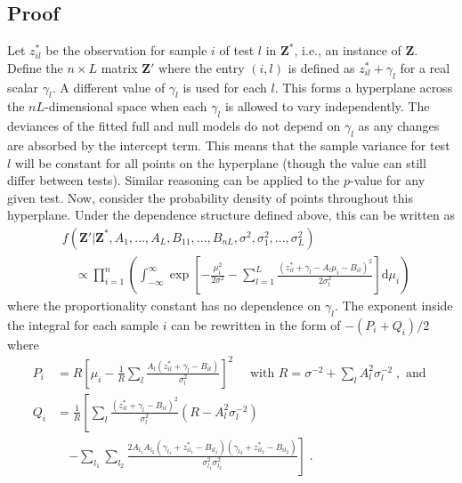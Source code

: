 \documentclass{article}
\newcommand{\nsamples}{n}
\newcommand{\sample}{i}
\newcommand{\normean}{\mu}
\newcommand{\normvar}{\sigma^2}
\newcommand{\modifier}{\gamma}
\newcommand{\logcount}{z}
\newcommand{\obsmat}[0]{\mathbf{Z}}
\newcommand{\matinst}[0]{\mathbf{Z^*}}
\newcommand{\modmat}[0]{\mathbf{Z}'}
\newcommand{\test}{l}
\newcommand{\ntests}{L}
\newcommand{\scaling}{A}
\newcommand{\interceptor}{B}
\newcommand{\scalar}{\scaling_\test}
\newcommand{\intercept}{\interceptor_{\sample\test}}
\newcommand{\testvar}{\normvar_\test}
\newcommand{\dt}{\modifier_\test}
\newcommand{\matlogcount}{\logcount^*_{\sample\test}}
\newcommand{\internalQ}{Q_\sample}
\newcommand{\internalR}{R}
\newcommand{\internalP}{P_\sample}
\newcommand{\invertvar}{\sigma^{-2}}
\newcommand{\inverttestvar}{\sigma^{-2}_\test}
\newcommand{\testone}{\test_1}
\newcommand{\testtwo}{\test_2}
\newcommand{\scalarone}{\scaling_{\testone}}
\newcommand{\interceptone}{\interceptor_{\sample\testone}}
\newcommand{\scalartwo}{\scaling_{\testtwo}}
\newcommand{\intercepttwo}{\interceptor_{\sample\testtwo}}
\newcommand{\dtone}{\modifier_{\testone}}
\newcommand{\dttwo}{\modifier_{\testtwo}}
\newcommand{\testvarone}{\normvar_{\testone}}
\newcommand{\testvartwo}{\normvar_{\testtwo}}
\newcommand{\matlogcountone}{\logcount^*_{\sample\testone}}
\newcommand{\matlogcounttwo}{\logcount^*_{\sample\testtwo}}
\begin{document}
\subsection{Proof}
Let $\matlogcount$ be the observation for sample $\sample$ of test $\test$ in $\matinst$, i.e., an instance of $\obsmat$.
Define the $\nsamples \times \ntests$ matrix $\modmat$ where the entry $(\sample, \test)$ is defined as $\matlogcount + \dt$ for a real scalar $\dt$.
A different value of $\dt$ is used for each $\test$.
This forms a hyperplane across the $\nsamples\ntests$-dimensional space when each $\dt$ is allowed to vary independently.
The deviances of the fitted full and null models do not depend on $\dt$ as any changes are absorbed by the intercept term.
This means that the sample variance for test $\test$ will be constant for all points on the hyperplane (though the value can still differ between tests).
Similar reasoning can be applied to the $p$-value for any given test.
Now, consider the probability density of points throughout this hyperplane. 
Under the dependence structure defined above, this can be written as
\begin{align*}
& f(\modmat | \matinst, \scaling_1, ..., \scaling_\ntests, \interceptor_{11}, ..., \interceptor_{\nsamples\ntests}, \normvar, \normvar_1, ..., \normvar_\ntests) \\
& \quad\propto \prod_{\sample=1}^\nsamples \left( \int_{-\infty}^{\infty} \exp\left[ - \frac{\normean_\sample^2}{2\normvar} 
	- \sum_{\test=1}^\ntests \frac{(\matlogcount + \dt - \scalar\normean_\sample - \intercept )^2}{2\testvar} \right]\mbox{d}\mu_\sample \right) 
\end{align*}
where the proportionality constant has no dependence on $\dt$.  
The exponent inside the integral for each sample $i$ can be rewritten in the form of $-(P_i + Q_i)/2$ where
\begin{align*}
\internalP &= \internalR\left[ \normean_\sample - \frac{1}{\internalR}\sum_\test \frac{\scalar(\matlogcount + \dt - \intercept)}{\testvar} \right]^2 \quad\mbox{ with } \internalR = \invertvar + \sum_\test \scalar^2\inverttestvar \;, \mbox{ and }\\
\internalQ &= \frac{1}{\internalR} \left[ \sum_\test \frac{(\matlogcount + \dt - \intercept)^2}{\testvar} (\internalR - \scalar^2 \invertvar_\test) \right. \\
    &\quad \left. - \sum_{\testone} \sum_{\testtwo} \frac{2 \scalarone\scalartwo (\dtone + \matlogcountone - \interceptone)(\dttwo + \matlogcounttwo - \intercepttwo)}{\testvarone\testvartwo} \right] \;.\end{align*}
\end{document}
